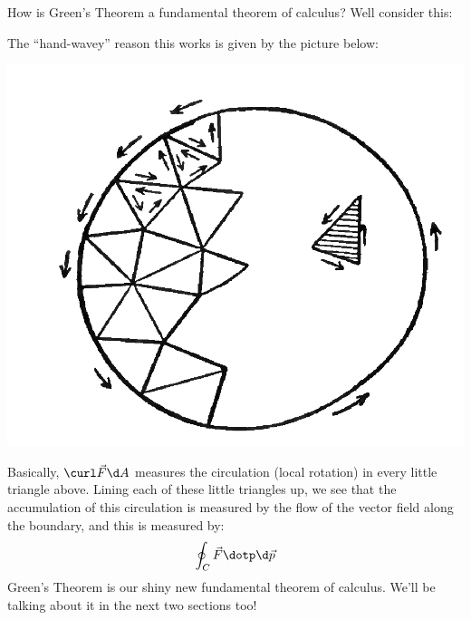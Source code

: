 \documentclass{ximera}
\begin{document}
How is Green's Theorem a fundamental theorem of calculus? Well
consider this:
\begin{image}
\end{image}
The ``hand-wavey'' reason this works is given by the picture below:
\begin{image}
  \includegraphics{circulation.png}
\end{image}
Basically, $\curl \vec{F}\d A$ measures the circulation (local
rotation) in every little triangle above. Lining each of these little
triangles up, we see that the accumulation of this circulation is
measured by the flow of the vector field along the boundary, and this
is measured by:
\[
\oint_C \vec{F}\dotp\d\vec{p}
\]
Green's Theorem is our shiny new fundamental theorem of calculus. We'll be talking about it in the next two sections too!
\end{document}
